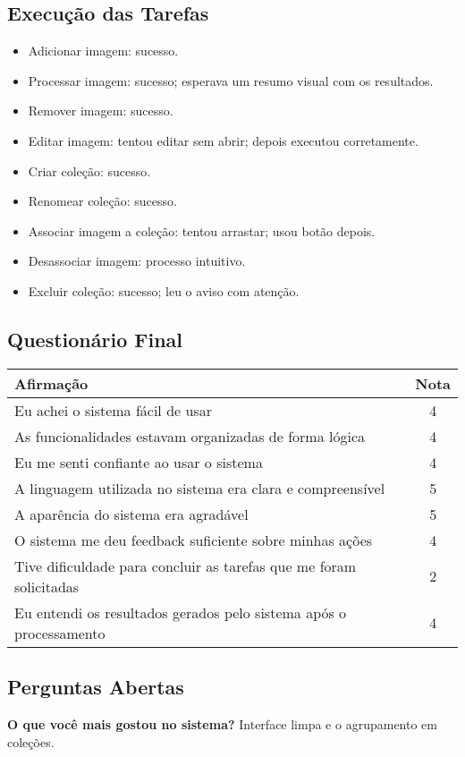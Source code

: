 \subsection*{Execução das Tarefas}
\begin{itemize}
    \item Adicionar imagem: sucesso.
    \item Processar imagem: sucesso; esperava um resumo visual com os resultados.
    \item Remover imagem: sucesso.
    \item Editar imagem: tentou editar sem abrir; depois executou corretamente.
    \item Criar coleção: sucesso.
    \item Renomear coleção: sucesso.
    \item Associar imagem a coleção: tentou arrastar; usou botão depois.
    \item Desassociar imagem: processo intuitivo.
    \item Excluir coleção: sucesso; leu o aviso com atenção.
\end{itemize}

\newpage

\subsection*{Questionário Final}
\begin{center}
\begin{tabular}{|p{10cm}|c|}
\hline
\textbf{Afirmação} & \textbf{Nota} \\
\hline
Eu achei o sistema fácil de usar & 4 \\
As funcionalidades estavam organizadas de forma lógica & 4 \\
Eu me senti confiante ao usar o sistema & 4 \\
A linguagem utilizada no sistema era clara e compreensível & 5 \\
A aparência do sistema era agradável & 5 \\
O sistema me deu feedback suficiente sobre minhas ações & 4 \\
Tive dificuldade para concluir as tarefas que me foram solicitadas & 2 \\
Eu entendi os resultados gerados pelo sistema após o processamento & 4 \\
\hline
\end{tabular}
\end{center}

\subsection*{Perguntas Abertas}
\textbf{O que você mais gostou no sistema?} Interface limpa e o agrupamento em coleções.

